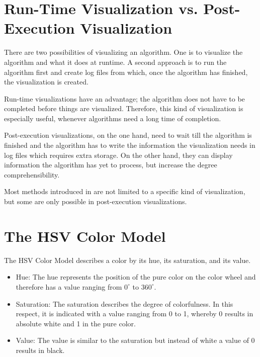 \documentclass
[
    paper = a4,
    pagesize,
    12 pt,
    twoside,                       %
    open = right,
    DIV = calc,
    BCOR = 0 mm,                   %
    bibtotoc
]
{scrbook}
\begin{document}
\section{Run-Time Visualization vs. Post-Execution Visualization}

There are two possibilities of visualizing an algorithm.
One is to visualize the algorithm and what it does at runtime.
A second approach is to run the algorithm first and create log files from which, once the algorithm has finished, the visualization is created.

Run-time visualizations have an advantage; the algorithm does not have to be completed before things are visualized.
Therefore, this kind of visualization is especially useful, whenever algorithms need a long time of completion.

Post-execution visualizations, on the one hand, need to wait till the algorithm is finished and the algorithm has to write the information the visualization needs in log files which requires extra storage.
On the other hand, they can display information the algorithm has yet to process, but increase the degree comprehensibility.

Most methods introduced in  are not limited to a specific kind of visualization, but some are only possible in post-execution visualizations.



\section{The HSV Color Model}

The HSV Color Model describes a color by its hue, its saturation, and its value.
\begin{itemize}
  \item Hue: The hue represents the position of the pure color on the color wheel and therefore has a value ranging from $0^\circ$ to $360^\circ$.
  \item Saturation: The saturation describes the degree of colorfulness. In this respect, it is indicated with a value ranging from 0 to 1, whereby 0 results in absolute white and 1 in the pure color.
  \item Value: The value is similar to the saturation but instead of white a value of 0 results in black.
\end{itemize}
\end{document}
